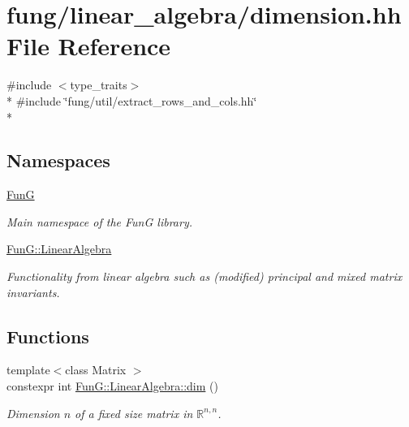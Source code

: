 \hypertarget{dimension_8hh}{}\section{fung/linear\+\_\+algebra/dimension.hh File Reference}
\label{dimension_8hh}
{\ttfamily \#include $<$type\+\_\+traits$>$}\\*
{\ttfamily \#include \char`\"{}fung/util/extract\+\_\+rows\+\_\+and\+\_\+cols.\+hh\char`\"{}}\\*
\subsection*{Namespaces}
\begin{DoxyCompactItemize}
\item 
 \hyperlink{namespaceFunG}{Fun\+G}
\begin{DoxyCompactList}\small\item\em Main namespace of the Fun\+G library. \end{DoxyCompactList}\item 
 \hyperlink{namespaceFunG_1_1LinearAlgebra}{Fun\+G\+::\+Linear\+Algebra}
\begin{DoxyCompactList}\small\item\em Functionality from linear algebra such as (modified) principal and mixed matrix invariants. \end{DoxyCompactList}\end{DoxyCompactItemize}
\subsection*{Functions}
\begin{DoxyCompactItemize}
\item 
{\footnotesize template$<$class Matrix $>$ }\\constexpr int \hyperlink{namespaceFunG_1_1LinearAlgebra_a13a029820c29d530274ae94968d642d4}{Fun\+G\+::\+Linear\+Algebra\+::dim} ()
\begin{DoxyCompactList}\small\item\em Dimension $n$ of a fixed size matrix in $\mathbb{R}^{n,n}$. \end{DoxyCompactList}\end{DoxyCompactItemize}
